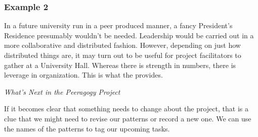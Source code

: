 \subsubsection*{Example 2}
In a future university run in a peer produced manner, a fancy
President's Residence presumably wouldn't be needed.  Leadership would
be carried out in a more collaborative and distributed fashion.
However, depending on just how distributed things are, it may turn out
to be useful for project facilitators to gather at a University Hall.
Whereas there is strength in numbers, there is leverage in
organization.  This is what the  provides.

\endgroup

\smallskip

\begin{framed}
\noindent
\emph{What's Next in the Peeragogy Project}
\begin{collectinmacro}{\RoadmapWN}{}{}
If it becomes clear that something needs to change about the project, that is a clue that we might need to revise our patterns or record a new one.  We can use the names of the patterns to tag our upcoming tasks.
\end{collectinmacro}
\RoadmapWN
\end{framed}


\newpage
